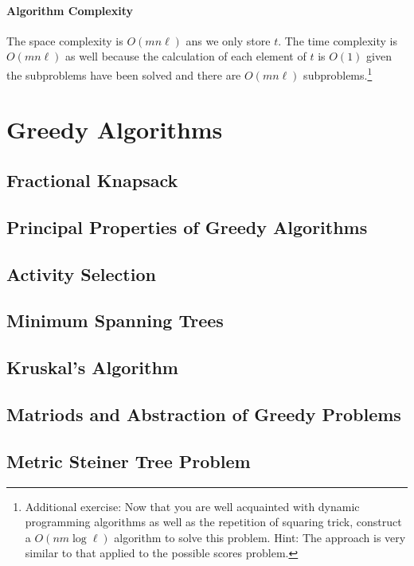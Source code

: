 \documentclass[11pt]{article}
\theoremstyle{plain}
\theoremstyle{definition}
\numberwithin{equation}{section}
\numberwithin{figure}{section}
\begin{document}
\paragraph{Algorithm Complexity} The space complexity is $O(mn\ell)$ ans we only store $t$. The time complexity is $O(mn\ell)$ as well because the calculation of each element of $t$ is $O(1)$ given the subproblems have been solved and there are $O(mn\ell)$ subproblems.\footnote{Additional exercise: Now that you are well acquainted with dynamic programming algorithms as well as the repetition of squaring trick, construct a $O(n m \log \ell)$ algorithm to solve this problem. Hint: The approach is very similar to that applied to the possible scores problem.}

\newpage
\section{Greedy Algorithms}

\subsection{Fractional Knapsack}

\subsection{Principal Properties of Greedy Algorithms}

\subsection{Activity Selection}

\subsection{Minimum Spanning Trees}

\subsection{Kruskal's Algorithm}

\subsection{Matriods and Abstraction of Greedy Problems}

\subsection{Metric Steiner Tree Problem}
\end{document}
